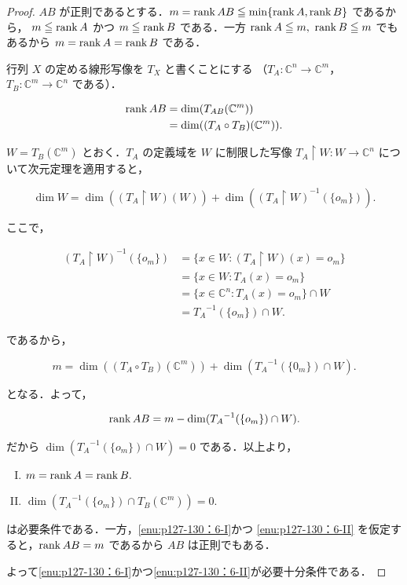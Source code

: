 \documentclass[a4paper,10pt,fleqn]{ltjsarticle}
\begin{document}
\begin{tleftbar}
    \begin{proof}
        $AB$ が正則であるとする．$m = \rank AB \leqq \min\{\rank A,\rank B \}$ であるから，
        $m \leqq \rank A$ かつ $m \leqq \rank B$ である．一方 $\rank A \leqq m,\ \rank B \leqq m$ でもあるから
        $m = \rank A = \rank B$ である．

        行列 $X$ の定める線形写像を $T_X$ と書くことにする
        （$T_A \colon  \mathbb{C}^n \to \mathbb{C}^m$，$ T_B \colon  \mathbb{C}^m \to \mathbb{C}^n$ である）．

        \begin{align*}
            \rank AB & = \dim(T_{AB}(\mathbb{C}^m))           \\
                     & = \dim((T_A \circ T_B)(\mathbb{C}^m)).
        \end{align*}

        $W = T_B(\mathbb{C}^m)$ とおく．$T_A$ の定義域を $W$ に制限した写像 $T_A \upharpoonright W : W \to \mathbb{C}^n$ について次元定理を適用すると，

        \[
            \dim W = \dim((T_A \upharpoonright W)(W)) + \dim((T_A \upharpoonright W)^{-1}(\{o_m\})).
        \]

        ここで，

        \begin{align*}
            (T_A \upharpoonright W)^{-1}(\{o_m\}) & = \{ x \in W : (T_A \upharpoonright W)(x) = o_m \} \\
                                                  & = \{ x \in W : T_A(x) = o_m \}                     \\
                                                  & = \{ x \in \mathbb{C}^n : T_A(x) = o_m \} \cap W   \\
                                                  & = {T_A}^{-1}(\{o_m\}) \cap W.
        \end{align*}

        であるから，

        \[
            m = \dim((T_A \circ T_B)(\mathbb{C}^m)) + \dim({T_A}^{-1}(\{0_m\}) \cap W).
        \]

        となる．よって，

        \[
            \rank AB = m - \dim({T_A}^{-1}(\{o_m\}) \cap W).
        \]

        だから $\dim({T_A}^{-1}(\{o_m\}) \cap W) = 0$ である．以上より，

        \begin{enumerate}[(I)]
            \item $m = \rank A = \rank B.$ \label{enu:p127-130：6-I}
            \item $\dim({T_A}^{-1}(\{o_m\}) \cap T_B(\mathbb{C}^m)) = 0.$\label{enu:p127-130：6-II}
        \end{enumerate}

        は必要条件である．一方，\ref{enu:p127-130：6-I}かつ \ref{enu:p127-130：6-II} を仮定すると，$\rank AB = m$ であるから $AB$ は正則でもある．

        よって\ref{enu:p127-130：6-I}かつ\ref{enu:p127-130：6-II}が必要十分条件である．
    \end{proof}
\end{tleftbar}
\end{document}
